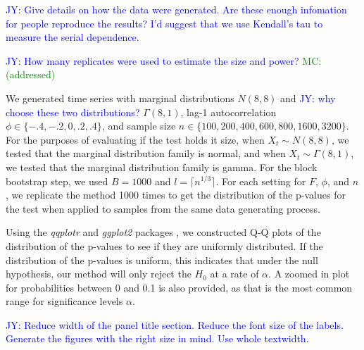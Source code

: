 \documentclass[12pt, titlepage, letterpaper]{article}
\newcommand{\jy}[1]{\textcolor{blue}{JY: #1}}
\newcommand{\mc}[1]{\textcolor{green}{MC: (#1)}}
\begin{document}
{\jy{Give details on how the data were generated. Are these enough infomation for
  people reproduce the results? I'd suggest that we use Kendall's tau to measure
  the serial dependence. }


\jy{How many replicates were used to estimate the size and power?}
\mc{addressed}

We generated time series with marginal distributions $N(8, 8)$ and
\jy{why choose these two distributions?}
$\Gamma(8, 1)$, lag-1 autocorrelation $\phi \in \{-.4, -.2, 0, .2, .4\}$, and
sample size $n \in \{100, 200, 400, 600, 800, 1600, 3200\}$. For the purposes of 
evaluating if the test holds it size, when $X_t \sim N(8, 8)$, we tested that the 
marginal distribution family is normal, and when $X_t \sim \Gamma(8, 1)$, we tested
that the marginal distribution family is gamma. For the block bootstrap step,
we used $B = 1000$ and $l = \lceil n^{1/3} \rceil$.
For each setting for $F$, $\phi$, and $n$, we replicate the method 1000 times 
to get the distribution of the p-values 
for the test when applied to samples from the same data generating process.


Using the \textsl{qqplotr} and \textsl{ggplot2} packages 
\citep{qqplotr, ggplot2},
we constructed Q-Q plots of the distribution of the p-values to see if they are
uniformly distributed. If the distribution of the p-values is uniform, this 
indicates that under the null hypothesis, our method will only reject the $H_0$
at a rate of $\alpha$.
A zoomed in plot for probabilities between 0 and 0.1 is
also provided, as
that is the most common range for significance levels $\alpha$. 

\jy{Reduce width of  the panel title section. Reduce the font size of the
  labels. Generate the figures with the right size in mind. Use whole textwidth.}
  
}
\end{document}
